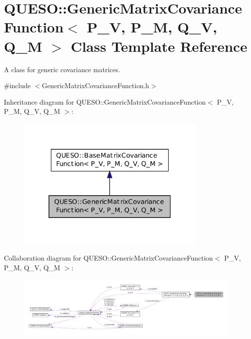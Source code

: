 \hypertarget{class_q_u_e_s_o_1_1_generic_matrix_covariance_function}{\section{Q\-U\-E\-S\-O\-:\-:Generic\-Matrix\-Covariance\-Function$<$ P\-\_\-\-V, P\-\_\-\-M, Q\-\_\-\-V, Q\-\_\-\-M $>$ Class Template Reference}
\label{class_q_u_e_s_o_1_1_generic_matrix_covariance_function}
}


A class for generic covariance matrices.  




{\ttfamily \#include $<$Generic\-Matrix\-Covariance\-Function.\-h$>$}



Inheritance diagram for Q\-U\-E\-S\-O\-:\-:Generic\-Matrix\-Covariance\-Function$<$ P\-\_\-\-V, P\-\_\-\-M, Q\-\_\-\-V, Q\-\_\-\-M $>$\-:
\nopagebreak
\begin{figure}[H]
\begin{center}
\leavevmode
\includegraphics[width=268pt]{class_q_u_e_s_o_1_1_generic_matrix_covariance_function__inherit__graph}
\end{center}
\end{figure}


Collaboration diagram for Q\-U\-E\-S\-O\-:\-:Generic\-Matrix\-Covariance\-Function$<$ P\-\_\-\-V, P\-\_\-\-M, Q\-\_\-\-V, Q\-\_\-\-M $>$\-:
\nopagebreak
\begin{figure}[H]
\begin{center}
\leavevmode
\includegraphics[width=350pt]{class_q_u_e_s_o_1_1_generic_matrix_covariance_function__coll__graph}
\end{center}
\end{figure}
